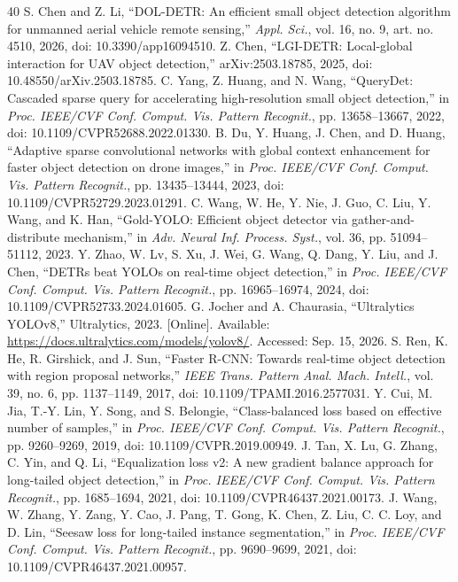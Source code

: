 \documentclass[journal]{IEEEtran}
\begin{document}
\begin{thebibliography}{40}
 S. Chen and Z. Li, ``DOL-DETR: An efficient small object detection algorithm for unmanned aerial vehicle remote sensing,'' \emph{Appl. Sci.}, vol. 16, no. 9, art. no. 4510, 2026, doi: 10.3390/app16094510.
 Z. Chen, ``LGI-DETR: Local-global interaction for UAV object detection,'' arXiv:2503.18785, 2025, doi: 10.48550/arXiv.2503.18785.
 C. Yang, Z. Huang, and N. Wang, ``QueryDet: Cascaded sparse query for accelerating high-resolution small object detection,'' in \emph{Proc. IEEE/CVF Conf. Comput. Vis. Pattern Recognit.}, pp. 13658--13667, 2022, doi: 10.1109/CVPR52688.2022.01330.
 B. Du, Y. Huang, J. Chen, and D. Huang, ``Adaptive sparse convolutional networks with global context enhancement for faster object detection on drone images,'' in \emph{Proc. IEEE/CVF Conf. Comput. Vis. Pattern Recognit.}, pp. 13435--13444, 2023, doi: 10.1109/CVPR52729.2023.01291.
 C. Wang, W. He, Y. Nie, J. Guo, C. Liu, Y. Wang, and K. Han, ``Gold-YOLO: Efficient object detector via gather-and-distribute mechanism,'' in \emph{Adv. Neural Inf. Process. Syst.}, vol. 36, pp. 51094--51112, 2023.
 Y. Zhao, W. Lv, S. Xu, J. Wei, G. Wang, Q. Dang, Y. Liu, and J. Chen, ``DETRs beat YOLOs on real-time object detection,'' in \emph{Proc. IEEE/CVF Conf. Comput. Vis. Pattern Recognit.}, pp. 16965--16974, 2024, doi: 10.1109/CVPR52733.2024.01605.
 G. Jocher and A. Chaurasia, ``Ultralytics YOLOv8,'' Ultralytics, 2023. [Online]. Available: \url{https://docs.ultralytics.com/models/yolov8/}. Accessed: Sep. 15, 2026.
 S. Ren, K. He, R. Girshick, and J. Sun, ``Faster R-CNN: Towards real-time object detection with region proposal networks,'' \emph{IEEE Trans. Pattern Anal. Mach. Intell.}, vol. 39, no. 6, pp. 1137--1149, 2017, doi: 10.1109/TPAMI.2016.2577031.
 Y. Cui, M. Jia, T.-Y. Lin, Y. Song, and S. Belongie, ``Class-balanced loss based on effective number of samples,'' in \emph{Proc. IEEE/CVF Conf. Comput. Vis. Pattern Recognit.}, pp. 9260--9269, 2019, doi: 10.1109/CVPR.2019.00949.
 J. Tan, X. Lu, G. Zhang, C. Yin, and Q. Li, ``Equalization loss v2: A new gradient balance approach for long-tailed object detection,'' in \emph{Proc. IEEE/CVF Conf. Comput. Vis. Pattern Recognit.}, pp. 1685--1694, 2021, doi: 10.1109/CVPR46437.2021.00173.
 J. Wang, W. Zhang, Y. Zang, Y. Cao, J. Pang, T. Gong, K. Chen, Z. Liu, C. C. Loy, and D. Lin, ``Seesaw loss for long-tailed instance segmentation,'' in \emph{Proc. IEEE/CVF Conf. Comput. Vis. Pattern Recognit.}, pp. 9690--9699, 2021, doi: 10.1109/CVPR46437.2021.00957.

\end{thebibliography}
\end{document}
